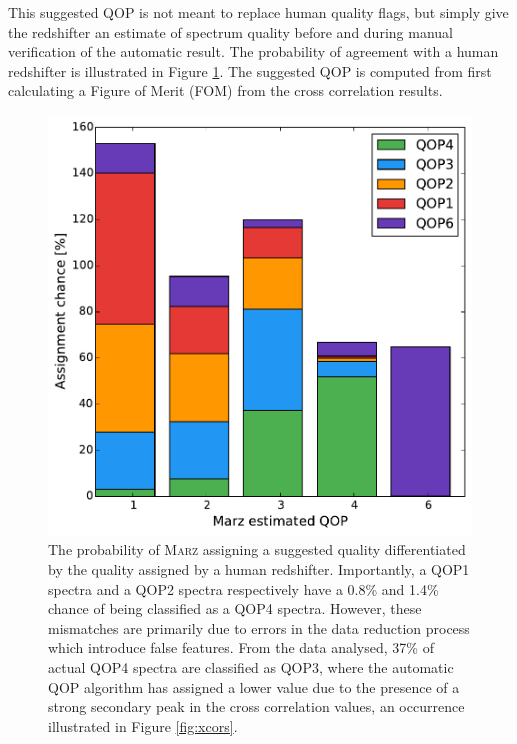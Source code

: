 \documentclass[iop]{emulateapj}
\newcommand{\marz}{\textsc{Marz}}
\begin{document}
This suggested QOP is not meant to replace human quality flags, but simply give the redshifter an estimate of spectrum quality before and during manual verification of the automatic result. The probability of agreement with a human redshifter is illustrated in Figure \ref{fig:autoqop}. The suggested QOP is computed from first calculating a Figure of Merit (FOM) from the cross correlation results.

\begin{figure}[h]
\centering
\includegraphics[width=\columnwidth]{autoqop.pdf}
\caption{The probability of \marz{} assigning a suggested quality differentiated by the quality assigned by a human redshifter. Importantly, a QOP1 spectra and a QOP2 spectra respectively have a 0.8\%  and 1.4\% chance of being classified as a QOP4 spectra. However, these mismatches are primarily due to errors in the data reduction process which introduce false features. From the data analysed, 37\% of actual QOP4 spectra are classified as QOP3, where the automatic QOP algorithm has assigned a lower value due to the presence of a strong secondary peak in the cross correlation values, an occurrence illustrated in Figure \ref{fig:xcors}.}
\label{fig:autoqop}
\end{figure}
\end{document}
